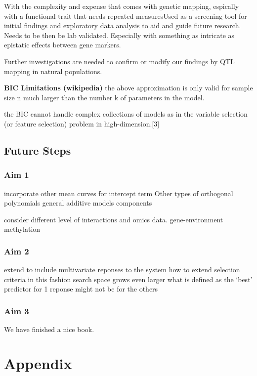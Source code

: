 \documentclass[11pt,]{book}
\theoremstyle{definition}
\theoremstyle{definition}
\theoremstyle{remark}
\begin{document}
With the complexity and expense that comes with genetic mapping,
espically with a functional trait that needs repeated measuresUsed as a
screening tool for initial findings and exploratory data analysis to aid
and guide future research. Needs to be then be lab validated. Especially
with something as intricate as epistatic effects between gene markers.

Further investigations are needed to confirm or modify our findings by
QTL mapping in natural populations.

\textbf{BIC Limitations (wikipedia)} the above approximation is only
valid for sample size n much larger than the number k of parameters in
the model.

the BIC cannot handle complex collections of models as in the variable
selection (or feature selection) problem in high-dimension.{[}3{]}

\section{Future Steps}\label{future-steps}

\subsection{Aim 1}\label{aim-1}

incorporate other mean curves for intercept term Other types of
orthogonal polynomials general additive models components

consider different level of interactions and omics data.
gene-environment methylation

\subsection{Aim 2}\label{aim-2}

extend to include multivariate reponses to the system how to extend
selection criteria in this fashion search space grows even larger what
is defined as the `best' predictor for 1 reponse might not be for the
others

\subsection{Aim 3}\label{aim-3}

We have finished a nice book.

\chapter{Appendix}\label{appendix}
\end{document}
